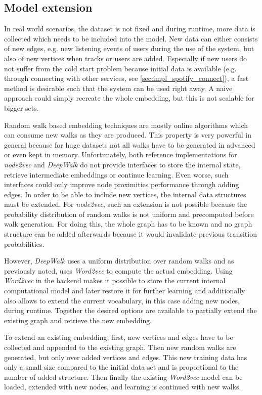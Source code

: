 \documentclass[sigconf]{acmart}
\begin{document}
\subsection{Model extension}
In real world scenarios, the dataset is not fixed and during runtime, more data is collected which needs to be included into the model. New data can either consists of new edges, e.g. new listening events of users during the use of the system, but also of new vertices when tracks or users are added. Especially if new users do not suffer from the cold start problem because initial data is available (e.g. through connecting with other services, see \ref{sec:impl_spotify_connect}), a fast method is desirable such that the system can be used right away. A naive approach could simply recreate the whole embedding, but this is not scalable for bigger sets. 

Random walk based embedding techniques are mostly online algorithms which can consume new walks as they are produced. This property is very powerful in general because for huge datasets not all walks have to be generated in advanced or even kept in memory. Unfortunately, both reference implementations for \emph{node2vec} and \emph{DeepWalk} do not provide interfaces to store the internal state, retrieve intermediate embeddings or continue learning. Even worse, such interfaces could only improve node proximities performance through adding edges. In order to be able to include new vertices, the internal data structures must be extended. For \emph{node2vec}, such an extension is not possible because the probability distribution of random walks is not uniform and precomputed before walk generation. For doing this, the whole graph has to be known and no graph structure can be added afterwards because it would invalidate previous transition probabilities.

However, \emph{DeepWalk} uses a uniform distribution over random walks and as previously noted, uses \emph{Word2vec} to compute the actual embedding. Using  \emph{Word2vec} in the backend makes it possible to store the current internal computational model and later restore it for further learning and additionally also allows to extend the current vocabulary, in this case adding new nodes, during runtime. Together the desired options are available to partially extend the existing graph and retrieve the new embedding.

To extend an existing embedding, first, new vertices and edges have to be collected and appended to the existing graph. Then new random walks are generated, but only over added vertices and edges. This new training data has only a small size compared to the initial data set and is proportional to the number of added structure. Then finally the existing \emph{Word2vec} model can be loaded, extended with new nodes, and learning is continued with new walks. \\
\end{document}
